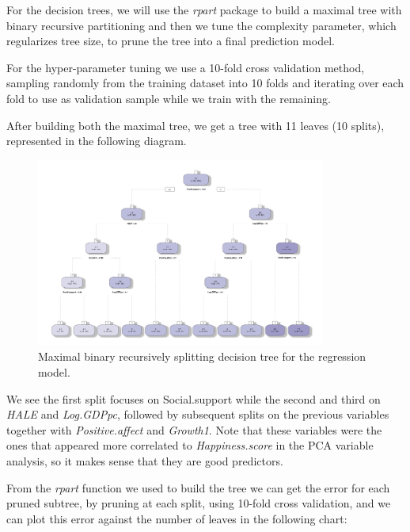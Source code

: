 \documentclass[12pt]{extarticle}
\begin{document}
For the decision trees, we will use the \textit{rpart} package to build a maximal tree with binary recursive partitioning and then we tune the complexity parameter, which regularizes tree size, to prune the tree into a final prediction model.

For the hyper-parameter tuning we use a 10-fold cross validation method, sampling randomly from the training dataset into 10 folds and iterating over each fold to use as validation sample while we train with the remaining. 

After building both the maximal tree, we get a tree with 11 leaves (10 splits), represented in the following diagram.

\begin{figure}[H]
  \centering
    \includegraphics[width=0.85\textwidth]{figures/tree.png}
    \caption{Maximal binary recursively splitting decision tree for the regression model.\label{fig:tree}}
\end{figure}

We see the first split focuses on Social.support while the second and third on \textit{HALE} and \textit{Log.GDPpc}, followed by subsequent splits on the previous variables together with \textit{Positive.affect} and \textit{Growth1}. Note that these variables were the ones that appeared more correlated to \textit{Happiness.score} in the PCA variable analysis, so it makes sense that they are good predictors.

From the \textit{rpart} function we used to build the tree we can get the error for each pruned subtree, by pruning at each split, using 10-fold cross validation, and we can plot this error against the number of leaves in the following chart:
\end{document}
